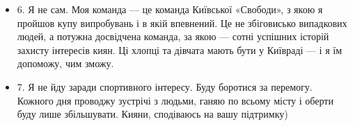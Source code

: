 \begin{itemize}
\item 6. Я не сам. Моя команда — це команда Київської «Свободи», з якою я пройшов
купу випробувань і в якій впевнений. Це не збіговисько випадкових людей, а
потужна досвідчена команда, за якою — сотні успішних історій захисту інтересів
киян. Ці хлопці та дівчата мають бути у Київраді — і я їм допоможу, чим зможу. 

\item 7. Я не йду заради спортивного інтересу. Буду боротися за перемогу.
Кожного дня проводжу зустрічі з людьми, ганяю по всьому місту і оберти
буду лише збільшувати.  Кияни, сподіваюсь на вашу підтримку)

\end{itemize}
